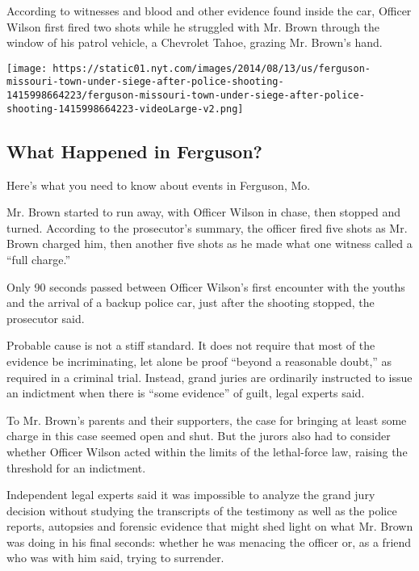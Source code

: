 According to witnesses and blood and other evidence found inside the
car, Officer Wilson first fired two shots while he struggled with Mr.
Brown through the window of his patrol vehicle, a Chevrolet Tahoe,
grazing Mr. Brown's hand.

\href{https://www.nytimes.com/interactive/2014/08/13/us/ferguson-missouri-town-under-siege-after-police-shooting.html}{}

\texttt{[image: https://static01.nyt.com/images/2014/08/13/us/ferguson-missouri-town-under-siege-after-police-shooting-1415998664223/ferguson-missouri-town-under-siege-after-police-shooting-1415998664223-videoLarge-v2.png]}

\hypertarget{what-happened-in-ferguson}{%
\subsection{What Happened in
Ferguson?}\label{what-happened-in-ferguson}}

Here's what you need to know about events in Ferguson, Mo.

Mr. Brown started to run away, with Officer Wilson in chase, then
stopped and turned. According to the prosecutor's summary, the officer
fired five shots as Mr. Brown charged him, then another five shots as he
made what one witness called a ``full charge.''

Only 90 seconds passed between Officer Wilson's first encounter with the
youths and the arrival of a backup police car, just after the shooting
stopped, the prosecutor said.

Probable cause is not a stiff standard. It does not require that most of
the evidence be incriminating, let alone be proof ``beyond a reasonable
doubt,'' as required in a criminal trial. Instead, grand juries are
ordinarily instructed to issue an indictment when there is ``some
evidence'' of guilt, legal experts said.

To Mr. Brown's parents and their supporters, the case for bringing at
least some charge in this case seemed open and shut. But the jurors also
had to consider whether Officer Wilson acted within the limits of the
lethal-force law, raising the threshold for an indictment.

Independent legal experts said it was impossible to analyze the grand
jury decision without studying the transcripts of the testimony as well
as the police reports, autopsies and forensic evidence that might shed
light on what Mr. Brown was doing in his final seconds: whether he was
menacing the officer or, as a friend who was with him said, trying to
surrender.

